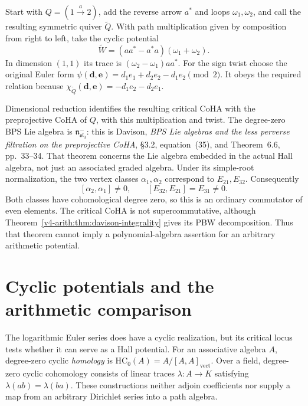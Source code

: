 \begin{example}
\label{v4-arith:ks:tripled-a2}
Start with $Q=(1\xrightarrow{a}2)$, add the reverse arrow $a^*$
and loops $\omega_1,\omega_2$, and call the resulting symmetric
quiver $\widetilde Q$. With path multiplication given by composition
from right to left, take the cyclic potential
\[
 \widetilde W=(aa^*-a^*a)(\omega_1+\omega_2).
\]
In dimension $(1,1)$ its trace is
$(\omega_2-\omega_1)aa^*$. For the sign twist choose the original
Euler form
$\psi(\mathbf d,\mathbf e)
=d_1e_1+d_2e_2-d_1e_2\pmod2$.
It obeys the required relation because
$\chi_{\widetilde Q}(\mathbf d,\mathbf e)
=-d_1e_2-d_2e_1$.

Dimensional reduction identifies the resulting critical CoHA with
the preprojective CoHA of $Q$, with this multiplication and twist.
The degree-zero BPS Lie algebra is
$\mathfrak n^-_{\mathfrak{sl}_3}$: this is Davison,
\emph{BPS Lie algebras and the less perverse filtration on the
preprojective CoHA}, \S3.2, equation~(35), and Theorem~6.6,
pp.~33--34. That theorem concerns the Lie algebra embedded in the
actual Hall algebra, not just an associated graded algebra.
Under its simple-root normalization, the two vertex classes
$\alpha_1,\alpha_2$ correspond to $E_{21},E_{32}$. Consequently
\[
 [\alpha_2,\alpha_1]\ne0,
 \qquad [E_{32},E_{21}]=E_{31}\ne0.
\]
Both classes have cohomological degree zero, so this is an ordinary
commutator of even elements. The critical CoHA is not
supercommutative, although Theorem~\ref{v4-arith:thm:davison-integrality}
gives its PBW decomposition. Thus that theorem cannot imply a
polynomial-algebra assertion for an arbitrary arithmetic potential.
\end{example}

\section{Cyclic potentials and the arithmetic comparison}
\label{v4-arith:ks:arithmetic-potential-comparison}

The logarithmic Euler series does have a cyclic realization, but its
critical locus tests whether it can serve as a Hall potential.
For an associative algebra $A$, degree-zero cyclic \emph{homology}
is $\mathrm{HC}_0(A)=A/[A,A]_{\mathrm{vect}}$.
Over a field, degree-zero cyclic cohomology consists of linear
traces $\lambda:A\to K$ satisfying $\lambda(ab)=\lambda(ba)$.
These constructions neither adjoin coefficients nor supply a map
from an arbitrary Dirichlet series into a path algebra.

